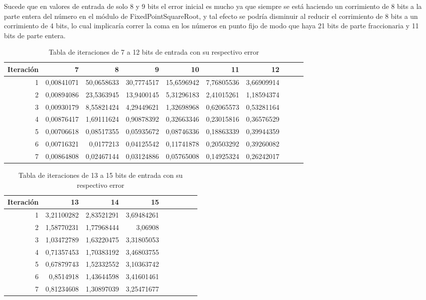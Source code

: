 Sucede que en valores de entrada de solo 8 y 9 bits el error inicial es mucho ya que siempre se está haciendo un corrimiento de 8 bits a la parte entera del número en el módulo de FixedPointSquareRoot, y tal efecto se podría disminuir  al reducir el corrimiento de 8 bits a un corrimiento de 4 bits, lo cual implicaría correr la coma en los números en punto fijo de modo que haya 21 bits de parte fraccionaria y 11 bits de parte entera.


\begin{table}[htbp]
  \centering
  \caption{Tabla de iteraciones de 7 a 12 bits de entrada con su respectivo error}
    \begin{tabular}{rrrrrrrrrr}
    \toprule
    Iteración & 7     & 8     & 9     & 10    & 11    & 12 \\
    \midrule
    1     & 0,00841071 & 50,0658633 & 30,7774517 & 15,6596942 & 7,76805536 & 3,66909914  \\
    2     & 0,00894086 & 23,5363945 & 13,9400145 & 5,31296183 & 2,41015261 & 1,18594374  \\
    3     & 0,00930179 & 8,55821424 & 4,29449621 & 1,32698968 & 0,62065573 & 0,53281164  \\
    4     & 0,00876417 & 1,69111624 & 0,90878392 & 0,32663346 & 0,23015816 & 0,36576529  \\
    5     & 0,00706618 & 0,08517355 & 0,05935672 & 0,08746336 & 0,18863339 & 0,39944359  \\
    6     & 0,00716321 & 0,0177213 & 0,04125542 & 0,11741878 & 0,20503292  & 0,39260082   \\
    7     & 0,00864808 & 0,02467144 & 0,03124886 & 0,05765008 & 0,14925324 & 0,26242017  \\
    \bottomrule
    \end{tabular}%
  \label{tab:errores1}%
\end{table}%
\begin{table}[htbp]
  \centering
  \caption{Tabla de iteraciones de 13 a 15 bits de entrada con su respectivo error}
    \begin{tabular}{rrrrrrrrr}
    \toprule
    Iteración     & 13    & 14    & 15 \\
    \midrule
    1    &    3,21100282 & 2,83521291 & 3,69484261 \\
    2    &    1,58770231 & 1,77968444 & 3,06908    \\
    3    &    1,03472789 & 1,63220475 & 3,31805053 \\
    4    &    0,71357453 & 1,70383192 & 3,46803755 \\
    5	 &    0,67879743 & 1,52332552 & 3,10363742 \\
    6    &    0,8514918 & 1,43644598  & 3,41601461  \\
    7    &    0,81234608 & 1,30897039 & 3,25471677 \\
    \bottomrule
    \end{tabular}%
  \label{tab:errores2}%
\end{table}%

